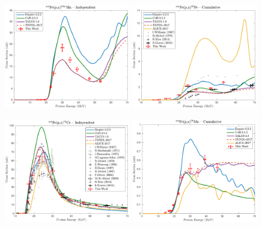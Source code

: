 \begin{figure}
 \centering
 \includegraphics[width=0.49\textwidth]{./figures/52mMn.pdf}
 \includegraphics[width=0.49\textwidth]{./figures/52Fe.pdf}
 
 \includegraphics[width=0.49\textwidth]{./figures/55Co.pdf}
 \includegraphics[width=0.49\textwidth]{./figures/56Mn.pdf}
 

\end{figure}

